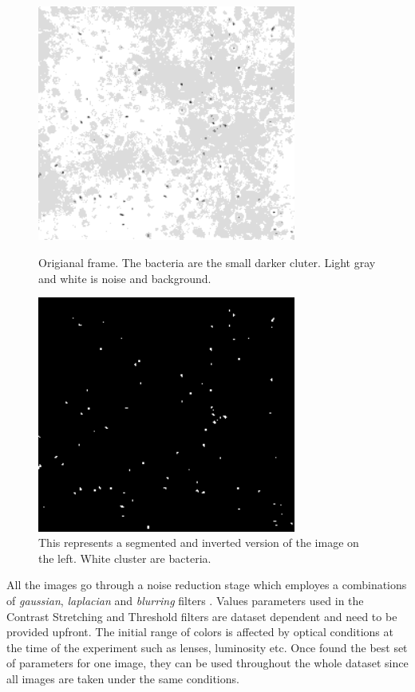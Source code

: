 \documentclass[conference]{IEEEtran}
\begin{document}
\begin{figure}

    \begin{minipage}[l]{1.0\columnwidth}
        \centering
        \includegraphics[width=8.5cm]{./images/bacteriasmall}
        \caption{Origianal frame. The bacteria are the small darker cluter. Light gray and white is noise and background.}\label{contrast}
    \end{minipage}
    \hfill{}
    \begin{minipage}[r]{1.0\columnwidth}
        \centering
        \includegraphics[width=8.5cm]{./images/bacteriasmall_threshold}
        \caption{This represents a segmented and inverted version of the image on the left. White cluster are bacteria.}\label{BBB}
    \end{minipage}
\end{figure}

 
All the images go through a noise reduction stage which employes a combinations of \textit{gaussian}, \textit{laplacian} and \textit{blurring} filters \cite{Deng:1993}.
Values parameters used in the Contrast Stretching and Threshold filters are dataset dependent and need to be provided upfront. The initial range of colors is affected by optical conditions at the time of the experiment such as lenses, luminosity etc. Once found the best set of parameters for one image, they can be used throughout the whole dataset since all images are taken under the same conditions.
\end{document}

